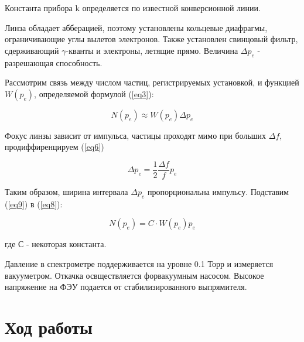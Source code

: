 \documentclass[a4paper]{article}
\begin{document}
Константа прибора k определяется по известной конверсионной линии.

Линза обладает абберацией, поэтому установлены кольцевые диафрагмы, ограничивающие
углы вылетов электронов. Также установлен свинцовый фильтр, сдерживающий $\gamma$-кванты 
и электроны, летящие прямо. Величина $\Delta p_e$ - разрешающая способность.

Рассмотрим связь между числом частиц, регистрируемых установкой, и функцией $W(p_e)$, 
определяемой формулой (\ref{eq3}):

\begin{equation}
    N(p_e) \approx W(p_e) \Delta p_e 
    \label{eq8}
\end{equation}

Фокус линзы зависит от импульса, частицы проходят мимо при больших $\Delta f$, 
продиффиренцируем (\ref{eq6})

\begin{equation}
    \Delta p_e = \frac{1}{2} \frac{\Delta f}{f} p_e
    \label{eq9}
\end{equation}

Таким образом, ширина интервала $\Delta p_e$ пропорциональна импульсу. Подставим 
(\ref{eq9}) в (\ref{eq8}):

\begin{equation}
    N(p_e) = C \cdot W(p_e) p_e
    \label{eq10}
\end{equation}

где С - некоторая константа.

Давление в спектрометре поддерживается на уровне 0.1 Торр и измеряется вакууметром.
Откачка освществляется форвакуумным насосом. Высокое напряжение на ФЭУ подается
от стабилизированного выпрямителя.


\section{Ход работы}
\end{document}
